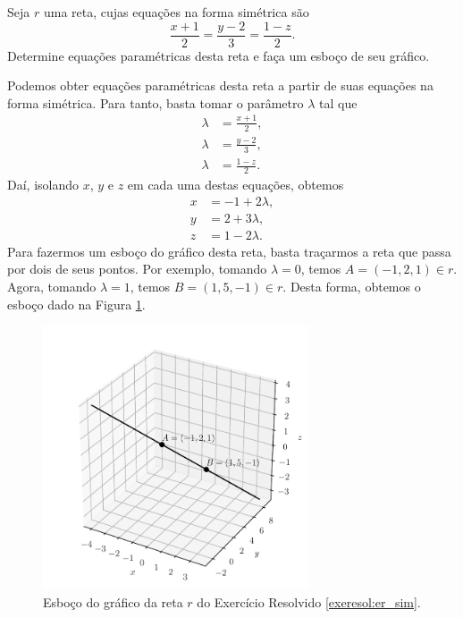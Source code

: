 \begin{exeresol}\label{exeresol:er_sim}
  Seja $r$ uma reta, cujas equações na forma simétrica são
  \begin{equation}
    \frac{x+1}{2} = \frac{y-2}{3} = \frac{1-z}{2}.
  \end{equation}
  Determine equações paramétricas desta reta e faça um esboço de seu gráfico.
\end{exeresol}
\begin{resol}
  Podemos obter equações paramétricas desta reta a partir de suas equações na forma simétrica. Para tanto, basta tomar o parâmetro $\lambda$ tal que
  \begin{align}
    \lambda &= \frac{x+1}{2},\\
    \lambda &= \frac{y-2}{3},\\
    \lambda &= \frac{1-z}{2}.
  \end{align}
  Daí, isolando $x$, $y$ e $z$ em cada uma destas equações, obtemos
  \begin{align}
    x &= -1 + 2\lambda,\\
    y &= 2 + 3\lambda,\\
    z &= 1 - 2\lambda.
  \end{align}
  Para fazermos um esboço do gráfico desta reta, basta traçarmos a reta que passa por dois de seus pontos. Por exemplo, tomando $\lambda = 0$, temos $A = (-1,2,1)\in r$. Agora, tomando $\lambda = 1$, temos $B = (1,5,-1)\in r$. Desta forma, obtemos o esboço dado na Figura \ref{fig:exeresol_er_sim}.

  \begin{figure}[H]
    \centering
    \includegraphics[width=0.7\textwidth]{./cap_erp/dados/fig_exeresol_er_sim/fig_exeresol_er_sim}
    \caption{Esboço do gráfico da reta $r$ do Exercício Resolvido \ref{exeresol:er_sim}.}
    \label{fig:exeresol_er_sim}
  \end{figure}
\end{resol}

